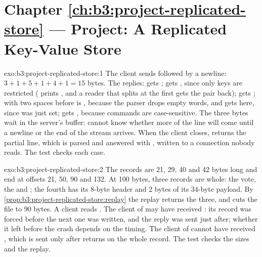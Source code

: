 \section*{Chapter \ref{ch:b3:project-replicated-store} --- Project: A Replicated Key-Value Store}

\begin{solution}{exo:b3:project-replicated-store:1}
The client sends  followed by a newline: $3 + 1 + 5 + 1 + 4 + 1 = 15$ bytes. The replies:  gets ;  gets , since only keys are restricted ( prints , and a reader that splits at the first \code{=} gets the pair back);  gets ;  with two spaces before  is , because the parser drops empty words, and gets  here, since  was just set;  gets , because commands are case-sensitive. The three bytes  wait in the server's buffer:  cannot know whether more of the line will come until a newline or the end of the stream arrives. When the client closes,  returns the partial line, which is parsed and answered with , written to a connection nobody reads. The test  checks each case.
\end{solution}

\begin{solution}{exo:b3:project-replicated-store:2}
The records are 21, 29, 40 and 42 bytes long and end at offsets 21, 50, 90 and 132. At 100 bytes, three records are whole: the vote, the  and ; the fourth has its 8-byte header and 2 bytes of its 34-byte payload. By \cref{prop:b3:project-replicated-store:replay} the replay returns the three, and  cuts the file to 90 bytes. A client reads . The client of  may have received : its record was forced before the next one was written, and the reply was sent just after; whether it left before the crash depends on the timing. The client of  cannot have received , which is sent only after  returns on the whole record. The test  checks the sizes and the replay.
\end{solution}

